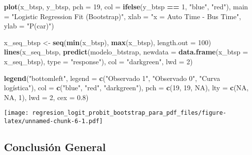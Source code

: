 \documentclass[
]{article}
\newenvironment{Shaded}{\begin{snugshade}}{\end{snugshade}}
\newcommand{\AttributeTok}[1]{\textcolor[rgb]{0.13,0.29,0.53}{#1}}
\newcommand{\ConstantTok}[1]{\textcolor[rgb]{0.56,0.35,0.01}{#1}}
\newcommand{\DecValTok}[1]{\textcolor[rgb]{0.00,0.00,0.81}{#1}}
\newcommand{\FloatTok}[1]{\textcolor[rgb]{0.00,0.00,0.81}{#1}}
\newcommand{\FunctionTok}[1]{\textcolor[rgb]{0.13,0.29,0.53}{\textbf{#1}}}
\newcommand{\NormalTok}[1]{#1}
\newcommand{\OtherTok}[1]{\textcolor[rgb]{0.56,0.35,0.01}{#1}}
\newcommand{\SpecialCharTok}[1]{\textcolor[rgb]{0.81,0.36,0.00}{\textbf{#1}}}
\newcommand{\StringTok}[1]{\textcolor[rgb]{0.31,0.60,0.02}{#1}}
\begin{document}
\begin{Shaded}
\begin{Highlighting}[]
\FunctionTok{plot}\NormalTok{(x\_btsp, y\_btsp, }\AttributeTok{pch =} \DecValTok{19}\NormalTok{, }\AttributeTok{col =} \FunctionTok{ifelse}\NormalTok{(y\_btsp }\SpecialCharTok{==} \DecValTok{1}\NormalTok{, }\StringTok{"blue"}\NormalTok{, }\StringTok{"red"}\NormalTok{),}
     \AttributeTok{main =} \StringTok{"Logistic Regression Fit (Bootstrap)"}\NormalTok{, }\AttributeTok{xlab =} \StringTok{"x = Auto Time {-} Bus Time"}\NormalTok{, }\AttributeTok{ylab =} \StringTok{"P(car)"}\NormalTok{)}

\NormalTok{x\_seq\_btsp }\OtherTok{\textless{}{-}} \FunctionTok{seq}\NormalTok{(}\FunctionTok{min}\NormalTok{(x\_btsp), }\FunctionTok{max}\NormalTok{(x\_btsp), }\AttributeTok{length.out =} \DecValTok{100}\NormalTok{)}
\FunctionTok{lines}\NormalTok{(x\_seq\_btsp, }\FunctionTok{predict}\NormalTok{(modelo\_btstrap, }\AttributeTok{newdata =} \FunctionTok{data.frame}\NormalTok{(}\AttributeTok{x\_btsp =}\NormalTok{ x\_seq\_btsp), }\AttributeTok{type =} \StringTok{"response"}\NormalTok{),}
      \AttributeTok{col =} \StringTok{"darkgreen"}\NormalTok{, }\AttributeTok{lwd =} \DecValTok{2}\NormalTok{)}

\FunctionTok{legend}\NormalTok{(}\StringTok{"bottomleft"}\NormalTok{, }\AttributeTok{legend =} \FunctionTok{c}\NormalTok{(}\StringTok{"Observado 1"}\NormalTok{, }\StringTok{"Observado 0"}\NormalTok{, }\StringTok{"Curva logística"}\NormalTok{),}
       \AttributeTok{col =} \FunctionTok{c}\NormalTok{(}\StringTok{"blue"}\NormalTok{, }\StringTok{"red"}\NormalTok{, }\StringTok{"darkgreen"}\NormalTok{), }\AttributeTok{pch =} \FunctionTok{c}\NormalTok{(}\DecValTok{19}\NormalTok{, }\DecValTok{19}\NormalTok{, }\ConstantTok{NA}\NormalTok{), }\AttributeTok{lty =} \FunctionTok{c}\NormalTok{(}\ConstantTok{NA}\NormalTok{, }\ConstantTok{NA}\NormalTok{, }\DecValTok{1}\NormalTok{), }\AttributeTok{lwd =} \DecValTok{2}\NormalTok{, }\AttributeTok{cex =} \FloatTok{0.8}\NormalTok{)}
\end{Highlighting}
\end{Shaded}

\texttt{[image: regresion\_logit\_probit\_bootstrap\_para\_pdf\_files/figure-latex/unnamed-chunk-6-1.pdf]}

\subsection{Conclusión General}\label{conclusiuxf3n-general}
\end{document}
